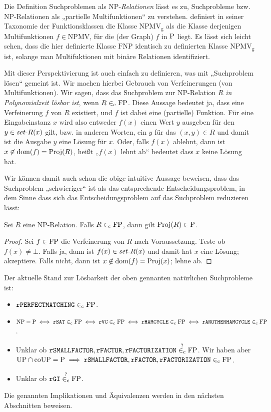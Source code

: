 Die Definition Suchproblemen als NP-\emph{Relationen} lässt es zu, Suchprobleme bzw. NP-Relationen als „partielle Multifunktionen“ zu verstehen.
\textcite{selman_taxonomy_1994} definiert in seiner Taxonomie der Funktionsklassen die Klasse $\mathrm{NPMV_g}$ als die Klasse derjenigen Multifunktionen $f\in\mathrm{NPMV}$, für die (der Graph) $f$ in $\P$ liegt.
Es lässt sich leicht sehen, dass die hier definierte Klasse $\mathrm{FNP}$ identisch zu \citeauthor{selman_taxonomy_1994} definierten Klasse $\mathrm{NPMV_g}$ ist, solange man Multifuktionen mit binäre Relationen identifiziert.

Mit dieser Perspektivierung ist auch einfach zu definieren, was mit „Suchproblem lösen“ gemeint ist. Wir machen hierbei Gebrauch von Verfeinerungen (von Multifunktionen).
Wir sagen, dass das Suchproblem zur NP-Relation $R$ \emph{in Polynomialzeit lösbar ist}, wenn $R\inc \mathrm{FP}$.
Diese Aussage bedeutet ja, dass eine Verfeinerung $f$ von $R$ existiert, und $f$ ist dabei eine (partielle) Funktion.
Für eine Eingabeinstanz $x$ wird also entweder $f(x)$ einen Wert $y$ ausgeben für den $y\in\fset{}R(x)$ gilt, bzw. in anderen Worten, ein $y$ für das $(x,y)\in R$ und damit ist die Ausgabe $y$ eine Lösung für $x$.
Oder, falls $f(x)$ ablehnt, dann ist $x\not\in\dom(f)=\Proj(R)$, heißt „$f(x)$ lehnt ab“ bedeutet dass $x$ keine Lösung hat.

Wir können damit auch schon die obige intuitive Aussage beweisen, dass das Suchproblem „schwieriger“ ist als das entsprechende Entscheidungsproblem, in dem Sinne dass sich das Entscheidungsproblem auf das Suchproblem reduzieren lässt:
\begin{observation}\label{obs:search-stronger-than-decision}
    Sei $R$ eine NP-Relation. Falls $R\inc\FP$, dann gilt $\Proj(R)\in\P$.
\end{observation}
\begin{proof}
    Sei $f\in\FP$ die Verfeinerung von $R$ nach Voraussetzung. Teste ob $f(x)\neq \bot$. Falls ja, dann ist $f(x)\in\fset{R}(x)$ und damit hat $x$ eine Lösung; akzeptiere. Falls nicht, dann ist $x\not\in\dom(f)=\Proj(x)$; lehne ab.
\end{proof}

Der aktuelle Stand zur Lösbarkeit der oben gennanten natürlichen Suchprobleme ist:
\begin{itemize}\raggedright
    \item $\mathtt{rPERFECTMATCHING}\inc\FP$.
    \item $\NP=\P \iff \mathtt{rSAT}\inc\FP \iff \mathtt{rVC}\inc\FP \iff \mathtt{rHAMCYCLE}\inc\FP \iff \mathtt{rANOTHERHAMCYCLE}\inc\FP$.
    \item Unklar ob $\mathtt{rSMALLFACTOR}, \mathtt{rFACTOR}, \mathtt{rFACTORIZATION}\stackrel{?}{\inc}\FP$. Wir haben aber $\UP\cap\coUP=\P \implies \mathtt{rSMALLFACTOR}, \mathtt{rFACTOR}, \mathtt{rFACTORIZATION}\inc\FP$.
    \item Unklar ob $\mathtt{rGI}\stackrel{?}{\inc}{\FP}$.
\end{itemize}
Die genannten Implikationen und Äquivalenzen werden in den nächsten Abschnitten beweisen.

